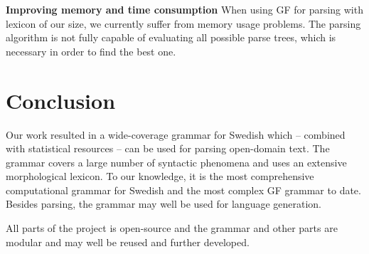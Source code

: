 \documentclass[runningheads,a4paper]{llncs}
\begin{document}

%


\textbf{Improving memory and time consumption}
When using GF for parsing with lexicon of our size, we currently
suffer from memory usage problems. The parsing algorithm is not fully
capable of evaluating all possible parse trees, which is necessary in order
to find the best one.




\section{Conclusion}
Our work resulted in a wide-coverage grammar for Swedish which --
combined with statistical resources -- can be used for parsing 
open-domain text. The grammar covers a large number of syntactic 
phenomena and uses an extensive morphological lexicon. To
our knowledge, it is the most comprehensive computational grammar for
Swedish and the most complex GF grammar to date.
Besides parsing, the grammar may well be used for language generation.

All parts of the project is open-source and the grammar and other parts
are modular and may well be reused and further developed.



\end{document}

